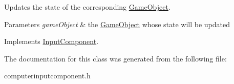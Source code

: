 Updates the state of the corresponding \hyperlink{classGameObject}{Game\-Object}. 


\begin{DoxyParams}{Parameters}
{\em game\-Object} & the \hyperlink{classGameObject}{Game\-Object} whose state will be updated \\
\hline
\end{DoxyParams}


Implements \hyperlink{classInputComponent_a93e790f7279e842ee249fefe7dbf7b32}{Input\-Component}.



The documentation for this class was generated from the following file\-:\begin{DoxyCompactItemize}
\item 
computerinputcomponent.\-h\end{DoxyCompactItemize}
